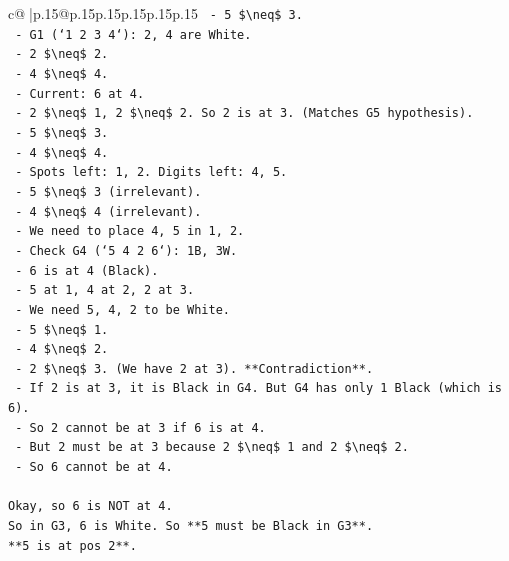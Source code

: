 \documentclass{article}
\begin{document}
{\begin{supertabular}{c@{$\;$}|p{.15\linewidth}@{}p{.15\linewidth}p{.15\linewidth}p{.15\linewidth}p{.15\linewidth}p{.15\linewidth}}
{{{\texttt{      {-} 5 \$\textbackslash{}neq\$ 3.} \\
\texttt{    {-} G1 (`1 2 3 4`): 2, 4 are White.} \\
\texttt{      {-} 2 \$\textbackslash{}neq\$ 2.} \\
\texttt{      {-} 4 \$\textbackslash{}neq\$ 4.} \\
\texttt{    {-} Current: 6 at 4.} \\
\texttt{    {-} 2 \$\textbackslash{}neq\$ 1, 2 \$\textbackslash{}neq\$ 2. So 2 is at 3. (Matches G5 hypothesis).} \\
\texttt{    {-} 5 \$\textbackslash{}neq\$ 3.} \\
\texttt{    {-} 4 \$\textbackslash{}neq\$ 4.} \\
\texttt{    {-} Spots left: 1, 2. Digits left: 4, 5.} \\
\texttt{    {-} 5 \$\textbackslash{}neq\$ 3 (irrelevant).} \\
\texttt{    {-} 4 \$\textbackslash{}neq\$ 4 (irrelevant).} \\
\texttt{    {-} We need to place 4, 5 in 1, 2.} \\
\texttt{    {-} Check G4 (`5 4 2 6`): 1B, 3W.} \\
\texttt{      {-} 6 is at 4 (Black).} \\
\texttt{      {-} 5 at 1, 4 at 2, 2 at 3.} \\
\texttt{      {-} We need 5, 4, 2 to be White.} \\
\texttt{      {-} 5 \$\textbackslash{}neq\$ 1.} \\
\texttt{      {-} 4 \$\textbackslash{}neq\$ 2.} \\
\texttt{      {-} 2 \$\textbackslash{}neq\$ 3. (We have 2 at 3). **Contradiction**.} \\
\texttt{      {-} If 2 is at 3, it is Black in G4. But G4 has only 1 Black (which is 6).} \\
\texttt{      {-} So 2 cannot be at 3 if 6 is at 4.} \\
\texttt{      {-} But 2 must be at 3 because 2 \$\textbackslash{}neq\$ 1 and 2 \$\textbackslash{}neq\$ 2.} \\
\texttt{      {-} So 6 cannot be at 4.} \\
\\ 
\texttt{Okay, so 6 is NOT at 4.} \\
\texttt{So in G3, 6 is White. So **5 must be Black in G3**.} \\
\texttt{**5 is at pos 2**.} \\
\\ 
}}}
\end{supertabular}}
\end{document}

